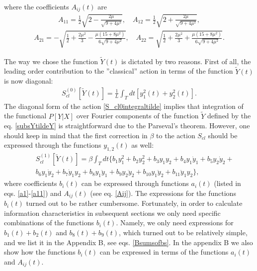 \documentclass{article}
\begin{document}
where the coefficients $A_{ij}(t)$ are
\begin{eqnarray}\label{Aij}
    A_{11} = \frac{1}{2} \sqrt{2-\frac{2\mu}{\sqrt{9+4\mu^{2}}}},\quad A_{12} = \frac{1}{2} \sqrt{2+\frac{2\mu}{\sqrt{9+4\mu^{2}}}},\nonumber
\end{eqnarray}
\begin{eqnarray}
    A_{21} = -\sqrt{\frac{1}{2}+\frac{2\mu^{2}}{3}-\frac{\mu\left(15+8\mu^{2}\right)}{6\sqrt{9+4\mu^{2}}}},\quad A_{22} = \sqrt{\frac{1}{2}+\frac{2\mu^{2}}{3}+\frac{\mu\left(15+8\mu^{2}\right)}{6\sqrt{9+4\mu^{2}}}}.
\end{eqnarray}

The way we chose the function $\tilde{Y}(t)$ is dictated by two reasons. First of all, the leading order contribution to the ''classical'' action in terms of the function $\tilde{Y}(t)$ is now diagonal:
\begin{eqnarray}\label{S_cl0integraltilde}
    S_{cl}^{(0)}[\tilde{Y}(t)] = \frac{1}{L}\int_{T} dt \left[y_{1}^{2}(t) + y_{2}^{2}(t)\right].
\end{eqnarray}
The diagonal form of the action \eqref{S_cl0integraltilde} implies that integration of the functional $P[Y|X]$ over Fourier components of the function $\tilde{Y}$ defined by the eq. \eqref{subsYtildeY} is straightforward due to the Parseval's theorem. However, one should keep in mind that the first correction in $\beta$ to the action $S_{cl}$ should be expressed through the functions $y_{1,2}(t)$ as well:
\begin{eqnarray}\label{S_1clintegraltilde}
    &&S_{cl}^{(1)}[\tilde{Y}(t)] = \beta \int_{T} dt \big\{b_{1}y_{1}^{2} + b_{2}y_{2}^{2} + b_{3}y_{1}y_{2} + b_{4}y_{1}\dot{y}_{1} + b_{5}y_{2}\dot{y}_{2} + \nonumber\\
    &&b_{6}y_{1}\dot{y}_{2} + b_{7}\dot{y}_{1}y_{2} + b_{8}y_{1}\ddot{y}_{1} + b_{9}y_{2}\ddot{y}_{2} + b_{10}y_{1}\ddot{y}_{2} + b_{11}\ddot{y}_{1}y_{2}\big\},
\end{eqnarray}
where coefficients $b_{i}(t)$ can be expressed through functions $a_{i}(t)$ (listed in eqs. \eqref{a1}-\eqref{a11}) and $A_{ij}(t)$ (see eq. \eqref{Aij}). The expressions for the functions $b_{i}(t)$ turned out to be rather cumbersome. Fortunately, in order to calculate information characteristics in subsequent sections we only need specific combinations of the functions $b_{i}(t)$. Namely, we only need expressions for $b_{1}(t)+b_{2}(t)$ and $b_{8}(t)+b_{9}(t)$, which turned out to be relatively simple, and we list it in the Appendix B, see eqs. \eqref{Bsumsofbs}. In the appendix B we also show how the functions $b_{i}(t)$ can be expressed in terms of the functions $a_{i}(t)$ and $A_{ij}(t)$.
\end{document}
